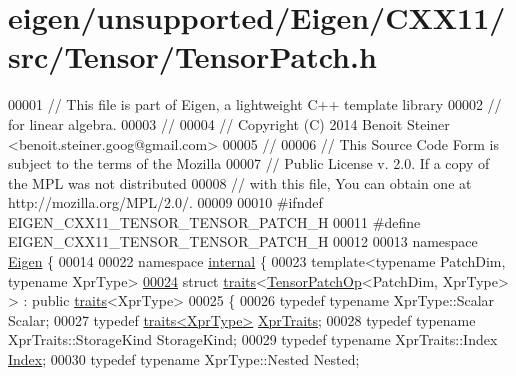 \hypertarget{eigen_2unsupported_2_eigen_2_c_x_x11_2src_2_tensor_2_tensor_patch_8h_source}{}\section{eigen/unsupported/\+Eigen/\+C\+X\+X11/src/\+Tensor/\+Tensor\+Patch.h}
\label{eigen_2unsupported_2_eigen_2_c_x_x11_2src_2_tensor_2_tensor_patch_8h_source}

\begin{DoxyCode}
00001 \textcolor{comment}{// This file is part of Eigen, a lightweight C++ template library}
00002 \textcolor{comment}{// for linear algebra.}
00003 \textcolor{comment}{//}
00004 \textcolor{comment}{// Copyright (C) 2014 Benoit Steiner <benoit.steiner.goog@gmail.com>}
00005 \textcolor{comment}{//}
00006 \textcolor{comment}{// This Source Code Form is subject to the terms of the Mozilla}
00007 \textcolor{comment}{// Public License v. 2.0. If a copy of the MPL was not distributed}
00008 \textcolor{comment}{// with this file, You can obtain one at http://mozilla.org/MPL/2.0/.}
00009 
00010 \textcolor{preprocessor}{#ifndef EIGEN\_CXX11\_TENSOR\_TENSOR\_PATCH\_H}
00011 \textcolor{preprocessor}{#define EIGEN\_CXX11\_TENSOR\_TENSOR\_PATCH\_H}
00012 
00013 \textcolor{keyword}{namespace }\hyperlink{namespace_eigen}{Eigen} \{
00014 
00022 \textcolor{keyword}{namespace }\hyperlink{namespaceinternal}{internal} \{
00023 \textcolor{keyword}{template}<\textcolor{keyword}{typename} PatchDim, \textcolor{keyword}{typename} XprType>
\hyperlink{struct_eigen_1_1internal_1_1traits_3_01_tensor_patch_op_3_01_patch_dim_00_01_xpr_type_01_4_01_4}{00024} \textcolor{keyword}{struct }\hyperlink{struct_eigen_1_1internal_1_1traits}{traits}<\hyperlink{class_eigen_1_1_tensor_patch_op}{TensorPatchOp}<PatchDim, XprType> > : \textcolor{keyword}{public} 
      \hyperlink{struct_eigen_1_1internal_1_1traits}{traits}<XprType>
00025 \{
00026   \textcolor{keyword}{typedef} \textcolor{keyword}{typename} XprType::Scalar Scalar;
00027   \textcolor{keyword}{typedef} \hyperlink{struct_eigen_1_1internal_1_1traits}{traits<XprType>} \hyperlink{struct_eigen_1_1internal_1_1traits}{XprTraits};
00028   \textcolor{keyword}{typedef} \textcolor{keyword}{typename} XprTraits::StorageKind StorageKind;
00029   \textcolor{keyword}{typedef} \textcolor{keyword}{typename} XprTraits::Index \hyperlink{namespace_eigen_a62e77e0933482dafde8fe197d9a2cfde}{Index};
00030   \textcolor{keyword}{typedef} \textcolor{keyword}{typename} XprType::Nested Nested;

\end{DoxyCode}
